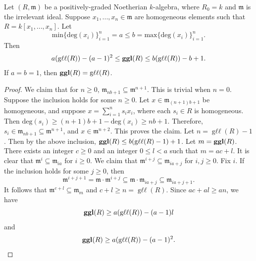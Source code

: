 \documentclass[10pt,a4paper]{amsart}
\DeclareMathOperator{\ggl}{\bf{ggl}}
\DeclareMathOperator{\gll}{\text{g}\ell\ell}
\begin{document}
\begin{proposition} Let $(R,\mathfrak{m})$ be a positively-graded Noetherian $k$-algebra, where $R_{0}=k$ and $\mathfrak{m}$ is the irrelevant ideal. Suppose $x_{1},...,x_{n} \in \mathfrak{m}$ are homogeneous elements such that $R=k[x_{1},...,x_{n}]$. Let 
\[
\text{min}\{\text{deg}(x_{i})\}_{i=1}^{n}=a \leq b = \text{max}\{\text{deg}(x_{i})\}_{i=1}^{n}.
\]
Then 
\[
a(\gll(R))-(a-1)^2 \leq  \ggl(R) \leq b(\gll(R))-b+1.
\]
\text{}\newline  
If $a=b=1$, then $\ggl(R)=\gll(R)$.
\end{proposition} 

\begin{proof} We claim that for $n \geq 0$, 
$\mathfrak{m}_{nb+1} \subseteq \mathfrak{m}^{n+1}$. 
This is trivial when $n=0$. Suppose the inclusion holds for some $n \geq 0$. Let $x \in \mathfrak{m}_{(n+1)b+1}$ be homogeneous, and suppose $x=\sum\limits_{i=1}^{n}s_{i}x_{i}$, where each $s_{i} \in R$ is homogeneous. Then $\text{deg}(s_{i}) \geq (n+1)b+1-\text{deg}(x_{i}) \geq nb+1.$ Therefore, $s_{i} \in \mathfrak{m}_{nb+1} \subseteq \mathfrak{m}^{n+1}$, and $x \in \mathfrak{m}^{n+2}$. This proves the claim. Let $n=\gll(R)-1$. Then by the above inclusion, $\ggl(R) \leq b(\gll(R)-1)+1$. \newline\newline 
Let $m=\ggl(R)$. There exists an integer $c\geq 0$ and an integer $0 \leq l < a$ such that $m=ac+l$. It is clear that $\mathfrak{m}^{i} \subseteq \mathfrak{m}_{ia}$ for $i \geq 0$. We claim that $\mathfrak{m}^{i+j} \subseteq \mathfrak{m}_{ia+j}$ for $i,j \geq 0$. Fix $i$. If the inclusion holds for some $j \geq 0$, then 
\[
\mathfrak{m}^{i+j+1}=\mathfrak{m} \cdot \mathfrak{m}^{i+j} \subseteq \mathfrak{m} \cdot \mathfrak{m}_{ia+j} \subseteq \mathfrak{m}_{ia+j+1}.
\] 
It follows that $\mathfrak{m}^{c+l} \subseteq \mathfrak{m}_{m}$ and $c+l \geq n=\gll(R)$. Since $ac+al \geq an$, we have 
\[
\ggl(R) \geq a(\gll(R))-(a-1)l
\]
and
\[
\ggl(R) \geq a(\gll(R))-(a-1)^2.
\]\end{proof}\text{}\newline
\end{document}
